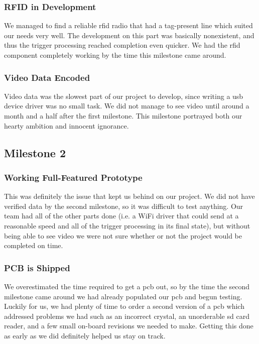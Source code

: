 \documentclass[12pt]{article}
\begin{document}
\subsubsection{RFID in Development}
We managed to find a reliable \gls{rfid} radio that had a tag-present line
which suited our needs very well. The development on this part was basically
nonexistent, and thus the trigger processing reached completion even quicker.
We had the \gls{rfid} component completely working by the time this milestone
came around.

\subsubsection{Video Data Encoded}
Video data was the slowest part of our project to develop, since writing a
\gls{usb} device driver was no small task. We did not manage to see video until
around a month and a half after the first milestone. This milestone portrayed
both our hearty ambition and innocent ignorance.

\subsection{Milestone 2}
\subsubsection{Working Full-Featured Prototype}
This was definitely the issue that kept us behind on our project. We did not
have verified data by the second milestone, so it was difficult to test
anything. Our team had all of the other parts done (i.e. a WiFi driver that
could send at a reasonable speed and all of the trigger processing in its final
state), but without being able to see video we were not sure whether or not the
project would be completed on time.

\subsubsection{PCB is Shipped}
We overestimated the time required to get a \gls{pcb} out, so by the time the
second milestone came around we had already populated our \gls{pcb} and begun
testing.  Luckily for us, we had plenty of time to order a second version of a
\gls{pcb} which addressed problems we had such as an incorrect crystal, an
unorderable \gls{sd} card reader, and a few small on-board revisions we needed
to make. Getting this done as early as we did definitely helped us stay on
track.
\end{document}
